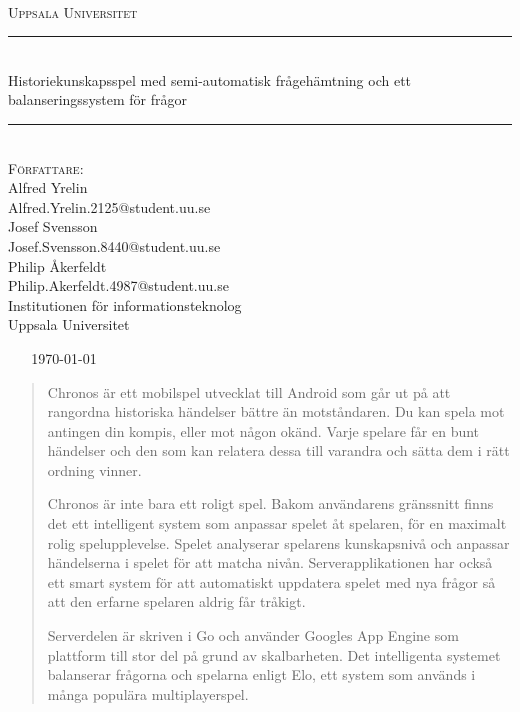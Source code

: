 \documentclass[a4paper, 11pt]{article}
\begin{document}
\begin{titlepage}
\newcommand{\HRule}{\rule{\linewidth}{0.5mm}}
\begin{center}

\textsc{\Large }\\[2.5cm]
\textsc{\LARGE Uppsala Universitet}\\[1.5cm] 

\HRule \\[0.3cm]
{ \huge \textup {Historiekunskapsspel med semi-automatisk frågehämtning och ett balanseringssystem för frågor}}\\[0.3cm]
\HRule \\[1.5cm]

\Large \textsc{Författare:}\\[0.5cm]
\large \textup{Alfred Yrelin}\\
\large \textup{Alfred.Yrelin.2125@student.uu.se}\\ [0.2cm]
\large \textup{Josef Svensson}\\
\large \textup{Josef.Svensson.8440@student.uu.se}\\[0.2cm]
\large \textup{Philip Åkerfeldt}\\
\large \textup{Philip.Akerfeldt.4987@student.uu.se}\\[0.5cm]

\large \textup{\textup{Institutionen för informationsteknolog}}\\
\large \textup{\textup{Uppsala Universitet}}\\[0.6cm]
\end{center}
~ \hfill
\center
~
{\Large \today}\\[2cm]
\vfill

\end{titlepage}

\newpage

\begin{abstract}
Chronos är ett mobilspel utvecklat till Android som går ut på att rangordna historiska händelser bättre än motståndaren. Du kan spela mot antingen din kompis, eller mot någon okänd.
Varje spelare får en bunt händelser och den som kan relatera dessa till varandra och sätta dem i rätt ordning vinner. 

Chronos är inte bara ett roligt spel. Bakom användarens gränssnitt finns det ett intelligent system som anpassar spelet åt spelaren, för en maximalt rolig spelupplevelse. Spelet analyserar spelarens kunskapsnivå och anpassar händelserna i spelet för att matcha nivån. Serverapplikationen har också ett smart system för att automatiskt uppdatera spelet med nya frågor så att den erfarne spelaren aldrig får tråkigt.

Serverdelen är skriven i Go och använder Googles App Engine som plattform till stor del på grund av skalbarheten. Det intelligenta systemet balanserar frågorna och spelarna enligt Elo, ett system som används i många populära multiplayerspel.
\end{abstract}
\end{document}
